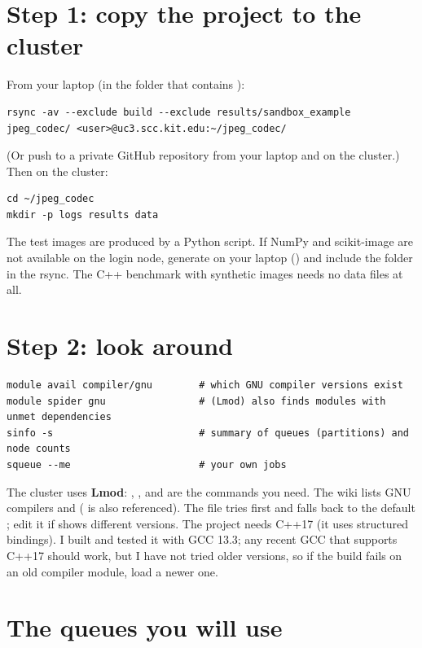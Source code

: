 \section{Step 1: copy the project to the cluster}

From your laptop (in the folder that contains ):
\begin{lstlisting}[style=shell]
rsync -av --exclude build --exclude results/sandbox_example jpeg_codec/ <user>@uc3.scc.kit.edu:~/jpeg_codec/
\end{lstlisting}
(Or push to a private GitHub repository from your laptop and  on the cluster.) Then on the cluster:
\begin{lstlisting}[style=shell]
cd ~/jpeg_codec
mkdir -p logs results data
\end{lstlisting}
The test images are produced by a Python script. If NumPy and scikit-image are not available on the login node, generate  on your laptop () and include the  folder in the rsync. The C++ benchmark with synthetic images needs no data files at all.

\section{Step 2: look around}

\begin{lstlisting}[style=shell]
module avail compiler/gnu        # which GNU compiler versions exist
module spider gnu                # (Lmod) also finds modules with unmet dependencies
sinfo -s                         # summary of queues (partitions) and node counts
squeue --me                      # your own jobs
\end{lstlisting}
The cluster uses \textbf{Lmod}: , ,  and  are the commands you need. The wiki lists GNU compilers  and  ( is also referenced). The file  tries  first and falls back to the default ; edit it if  shows different versions. The project needs C++17 (it uses structured bindings). I built and tested it with GCC 13.3; any recent GCC that supports C++17 should work, but I have not tried older versions, so if the build fails on an old compiler module, load a newer one.

\section{The queues you will use}

